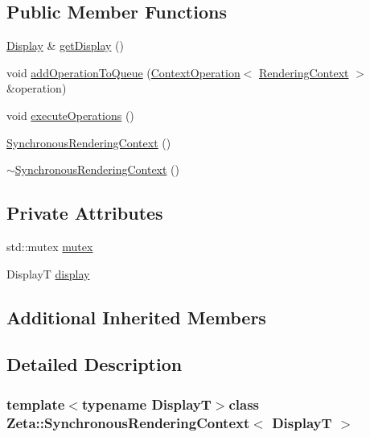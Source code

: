 \subsection*{Public Member Functions}
\begin{DoxyCompactItemize}
\item 
\hyperlink{classZeta_1_1Display}{Display} \& \hyperlink{classZeta_1_1SynchronousRenderingContext_afaa2ed7e145e76c86cfc8b2a2758ee84}{get\+Display} ()
\item 
void \hyperlink{classZeta_1_1SynchronousRenderingContext_a7bf5cc95e195b09df8d75f75e771115a}{add\+Operation\+To\+Queue} (\hyperlink{classZeta_1_1ContextOperation}{Context\+Operation}$<$ \hyperlink{classZeta_1_1RenderingContext}{Rendering\+Context} $>$ \&operation)
\item 
void \hyperlink{classZeta_1_1SynchronousRenderingContext_afe8b238d3302e2bdb0f2fcc0735c24e3}{execute\+Operations} ()
\item 
\hyperlink{classZeta_1_1SynchronousRenderingContext_a9e871f9f8f8c4a55657dbc816f75ee63}{Synchronous\+Rendering\+Context} ()
\item 
\hyperlink{classZeta_1_1SynchronousRenderingContext_a74ac76c14c19a5645c24c68cd3195f1f}{$\sim$\+Synchronous\+Rendering\+Context} ()
\end{DoxyCompactItemize}
\subsection*{Private Attributes}
\begin{DoxyCompactItemize}
\item 
std\+::mutex \hyperlink{classZeta_1_1SynchronousRenderingContext_a9d7b048e2278ca9878847e053fb57f44}{mutex}
\item 
Display\+T \hyperlink{classZeta_1_1SynchronousRenderingContext_a6c95c3ec9d5089710d48fb5a3ef3f7a6}{display}
\end{DoxyCompactItemize}
\subsection*{Additional Inherited Members}


\subsection{Detailed Description}
\subsubsection*{template$<$typename Display\+T$>$class Zeta\+::\+Synchronous\+Rendering\+Context$<$ Display\+T $>$}

